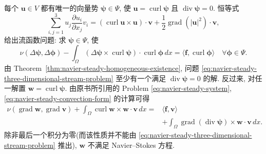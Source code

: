 每个 $\mathbf u\in V$ 都有唯一的向量势
$\boldsymbol\psi\in\Psi$, 使
$\mathbf u=\operatorname{curl}\boldsymbol\psi$ 且
$\operatorname{div}\boldsymbol\psi=0$. 恒等式
\begin{equation}\label{eq:navier-steady-three-dimensional-convection-identity}
\sum_{i,j=1}^{3}u_j\frac{\partial u_i}{\partial x_j}v_i
=(\operatorname{curl}\mathbf u\times\mathbf u)\cdot\mathbf v
+\frac12\operatorname{grad}(|\mathbf u|^2)\cdot\mathbf v,
\end{equation}
给出流函数问题: 求 $\boldsymbol\psi\in\Psi$, 使
\begin{equation}\label{eq:navier-steady-three-dimensional-stream-problem}
\nu(\Delta\boldsymbol\psi,\Delta\boldsymbol\phi)
-\int_\Omega
(\Delta\boldsymbol\psi\times\operatorname{curl}\boldsymbol\psi)
\cdot\operatorname{curl}\boldsymbol\phi\,dx
=\langle\mathbf f,\operatorname{curl}\boldsymbol\phi\rangle
\quad\forall\boldsymbol\phi\in\Psi.
\end{equation}
由 Theorem~\ref{thm:navier-steady-homogeneous-existence}, 问题
\eqref{eq:navier-steady-three-dimensional-stream-problem} 至少有一个满足
$\operatorname{div}\boldsymbol\psi=0$ 的解. 反过来, 对任一解置
$\mathbf w=\operatorname{curl}\boldsymbol\psi$. 由原书所引用的
Problem \eqref{eq:navier-steady-system}, \eqref{eq:navier-steady-convection-form}
的计算可得
\[
\begin{aligned}
\nu(\operatorname{grad}\mathbf w,\operatorname{grad}\mathbf v)
+\int_\Omega\operatorname{curl}\mathbf w\times\mathbf w\cdot\mathbf v\,dx
={}&\langle\mathbf f,\mathbf v\rangle\\
&+\int_\Omega
\operatorname{grad}(\operatorname{div}\boldsymbol\psi)
\times\mathbf w\cdot\mathbf v\,dx.
\end{aligned}
\]
除非最后一个积分为零(而该性质并不能由
\eqref{eq:navier-steady-three-dimensional-stream-problem} 推出),
$\mathbf w$ 不满足 Navier--Stokes 方程.

